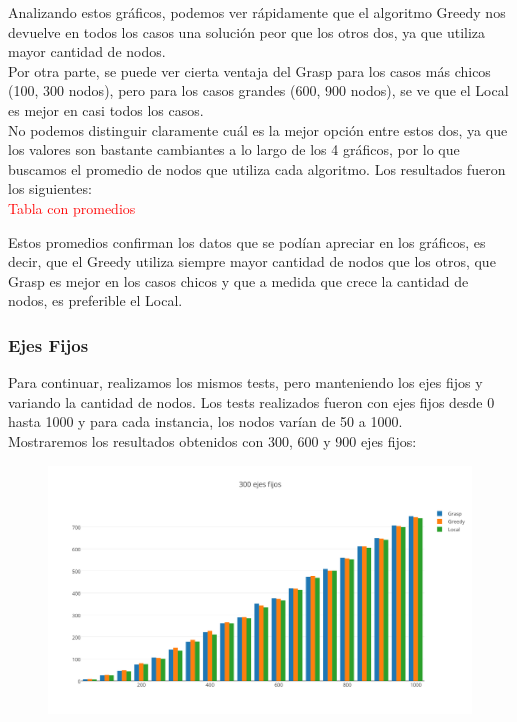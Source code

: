 Analizando estos gr\'aficos, podemos ver r\'apidamente que el algoritmo Greedy nos devuelve en todos los casos una soluci\'on peor que los otros dos, ya que utiliza mayor cantidad de nodos.\\
Por otra parte, se puede ver cierta ventaja del Grasp para los casos m\'as chicos (100, 300 nodos), pero para los casos grandes (600, 900 nodos), se ve que el Local es mejor en casi todos los casos.\\

No podemos distinguir claramente cu\'al es la mejor opci\'on entre estos dos, ya que los valores son bastante cambiantes a lo largo de los 4 gr\'aficos, por lo que buscamos el promedio de nodos que utiliza
cada algoritmo. Los resultados fueron los siguientes:\\

\textcolor{red}{Tabla con promedios}

Estos promedios confirman los datos que se pod\'ian apreciar en los gr\'aficos, es decir, que el Greedy utiliza siempre mayor cantidad de nodos que los otros, que Grasp es mejor en los casos chicos y
que a medida que crece la cantidad de nodos, es preferible el Local.\\

\subsubsection{Ejes Fijos}
Para continuar, realizamos los mismos tests, pero manteniendo los ejes fijos y variando la cantidad de nodos. Los tests realizados fueron con ejes fijos desde 0 hasta 1000 y para cada instancia,
los nodos var\'ian de 50 a 1000.\\

Mostraremos los resultados obtenidos con 300, 600 y 900 ejes fijos:\\

  \begin{figure}[h!]
   \begin{center}
 	\includegraphics[scale=0.7]{imagenes/6/300EjesFijos.png}
   \end{center}
 \end{figure}
 
